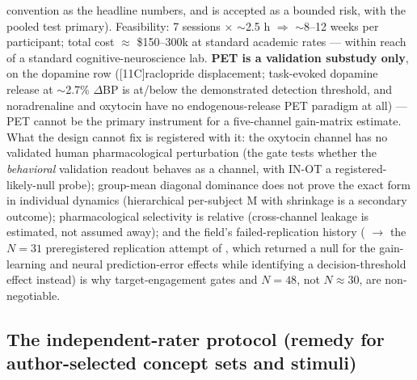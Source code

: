 \documentclass[11pt,twocolumn]{article}
\theoremstyle{plain}
\begin{document}
convention as the headline numbers, and is accepted as a bounded risk, with the pooled test primary). Feasibility: 7 sessions \(\times\) \(\sim\)2.5 h \(\Rightarrow\) \(\sim\)8--12 weeks per participant; total cost \(\approx\) \$150--300k at standard academic rates --- within reach of a standard cognitive-neuroscience lab. \textbf{PET is a validation substudy only}, on the dopamine row ([11C]raclopride displacement; task-evoked dopamine release at \(\sim\)2.7\% \(\Delta\)BP is at/below the demonstrated detection threshold, and noradrenaline and oxytocin have no endogenous-release PET paradigm at all) --- PET cannot be the primary instrument for a five-channel gain-matrix estimate. What the design cannot fix is registered with it: the oxytocin channel has no validated human pharmacological perturbation (the gate tests whether the \emph{behavioral} validation readout behaves as a channel, with IN-OT a registered-likely-null probe); group-mean diagonal dominance does not prove the exact form in individual dynamics (hierarchical per-subject M with shrinkage is a secondary outcome); pharmacological selectivity is relative (cross-channel leakage is estimated, not assumed away); and the field's failed-replication history (\citealp{pessiglione2006} \(\to\) the \(N = 31\) preregistered replication attempt of \citealp{chakroun2023}, which returned a null for the gain-learning and neural prediction-error effects while identifying a decision-threshold effect instead) is why target-engagement gates and \(N = 48\), not \(N \approx 30\), are non-negotiable.

\subsection{The independent-rater protocol (remedy for author-selected concept sets and stimuli)}
\label{sec:rater}
\end{document}
